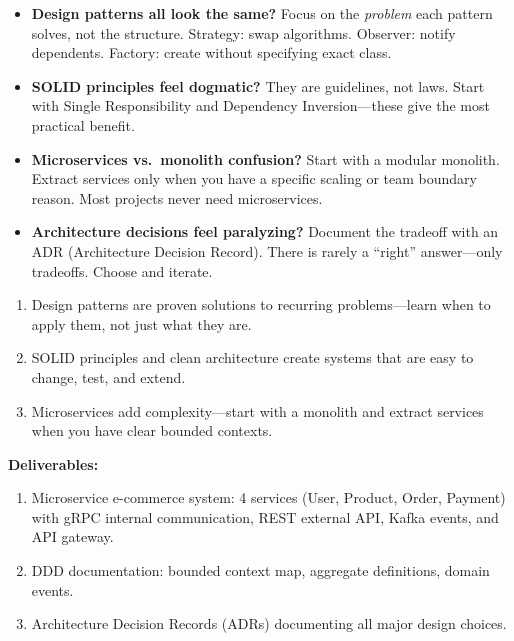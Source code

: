 \documentclass[11pt, a4paper, oneside]{report}
\begin{document}
\begin{stuckbox}
\begin{itemize}[leftmargin=*]
\item \textbf{Design patterns all look the same?} Focus on the \emph{problem} each pattern solves, not the structure. Strategy: swap algorithms. Observer: notify dependents. Factory: create without specifying exact class.
\item \textbf{SOLID principles feel dogmatic?} They are guidelines, not laws. Start with Single Responsibility and Dependency Inversion---these give the most practical benefit.
\item \textbf{Microservices vs.\ monolith confusion?} Start with a modular monolith. Extract services only when you have a specific scaling or team boundary reason. Most projects never need microservices.
\item \textbf{Architecture decisions feel paralyzing?} Document the tradeoff with an ADR (Architecture Decision Record). There is rarely a ``right'' answer---only tradeoffs. Choose and iterate.
\end{itemize}
\end{stuckbox}


\begin{takeawaybox}
\begin{enumerate}[leftmargin=*]
\item Design patterns are proven solutions to recurring problems---learn when to apply them, not just what they are.
\item SOLID principles and clean architecture create systems that are easy to change, test, and extend.
\item Microservices add complexity---start with a monolith and extract services when you have clear bounded contexts.
\end{enumerate}
\end{takeawaybox}

\begin{milestonebox}
\textbf{Deliverables:}
\begin{enumerate}[leftmargin=*]
\item Microservice e-commerce system: 4 services (User, Product, Order, Payment) with gRPC internal communication, REST external API, Kafka events, and API gateway.
\item DDD documentation: bounded context map, aggregate definitions, domain events.
\item Architecture Decision Records (ADRs) documenting all major design choices.
\end{enumerate}
\end{milestonebox}
\end{document}
